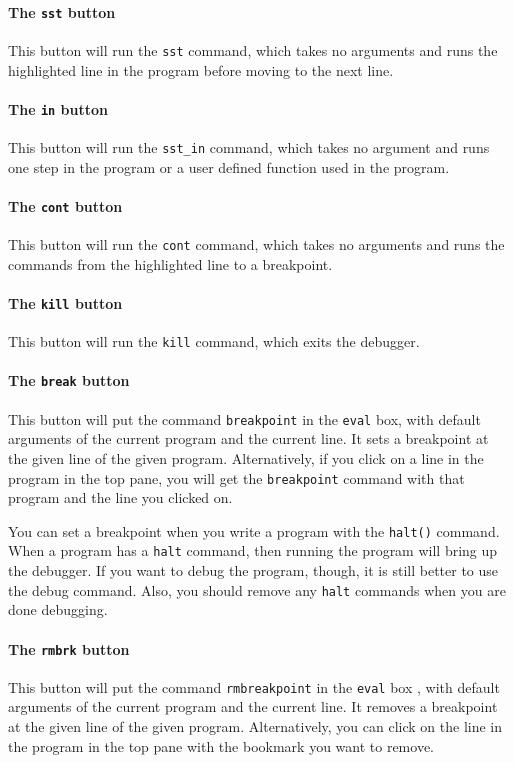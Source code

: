 \documentclass[a4paper,11pt]{book}
\begin{document}
\paragraph{The \texttt{sst} button}
This button will run the \texttt{sst} command, which takes no
arguments and runs the highlighted line in the program before moving
to the next line.

\paragraph{The \texttt{in} button}
This button will run the \texttt{sst\_in} command, which takes no
argument and runs one step in the program or a user defined
function used in the program.

\paragraph{The \texttt{cont} button}
This button will run the \texttt{cont} command, which takes no
arguments and runs the commands from the highlighted line to a  breakpoint.

\paragraph{The \texttt{kill} button}
This button will run the \texttt{kill} command, which exits the debugger.

\paragraph{The \texttt{break} button}
This button will put the command \texttt{breakpoint}
in the \texttt{eval} box, with default
arguments of the current program and the current line.  It sets a
breakpoint at the given line of the given program.
Alternatively, if you click on a line in the program in the top pane,
you will get the \texttt{breakpoint} command with that program and the
line you clicked on.

You can set a breakpoint when you write a program with the
\texttt{halt()} command.  When a program has a
\texttt{halt} command, then running the program will bring up the
debugger.  If you want to debug the program, though, it is still
better to use the debug command.  Also, you should remove any
\texttt{halt} commands when you are done debugging.

\paragraph{The \texttt{rmbrk} button}
This button will put the command
\texttt{rmbreakpoint} in the \texttt{eval} box , with default
arguments of the current program and the current line.  It removes a 
breakpoint at the given line of the given program.  Alternatively, you
can click on the line in the program in the top pane with the bookmark
you want to remove.
\end{document}

